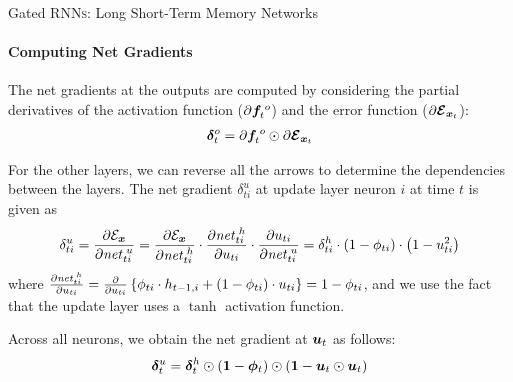 %
\begin{frame}{Gated RNN\textsc{s}: Long Short-Term Memory Networks}
\framesubtitle{Computing Net Gradients}
The
net gradients at the outputs are computed by considering the
partial derivatives of the activation function ($\partial{\boldsymbol f}^{\;o}_t$)
and the error function ($\partial{\bm{\mathcal E}}_{{\boldsymbol x}_t}$):
\begin{align*}
    {\bm \delta}^o_t = \partial{\boldsymbol f}^{\;o}_t \odot \partial{\bm{\mathcal E}}_{{\boldsymbol x}_t}
\end{align*}

For the other layers, we can reverse all the arrows to determine the
dependencies between the layers.
The net gradient $\delta_{ti}^u$ at update layer neuron $i$ at time $t$ is given as
\begin{align*}
    \delta_{ti}^u = 
    \frac{\partial {\mathcal E}_{\boldsymbol x}}{\partial \mathit{net}^{\;u}_{ti}}  = 
    \frac{\partial {\mathcal E}_{\boldsymbol x}}{\partial \mathit{net}^{\;h}_{ti}} \cdot 
    \frac{\partial \mathit{net}^{\;h}_{ti}}{\partial u_{ti}} \cdot
    \frac{\partial u_{ti}}{\partial \mathit{net}^{\;u}_{ti}}
     = \delta^h_{ti} \cdot (1 - \phi_{ti}) \cdot \left(1-u_{ti}^2\right)
\end{align*}
where 
$\frac{\partial \mathit{net}^{\;h}_{ti}}{\partial u_{ti}} = 
     \frac{\partial}{\partial
    u_{ti}} \left\{ \phi_{ti} \cdot h_{t-1,i} +  (1-\phi_{ti}) \cdot
    u_{ti}\right\} = 1 - \phi_{ti}$, and 
we use the fact that the update layer uses a $\tanh$ activation
function.

Across all neurons, we obtain the net gradient at
${\boldsymbol u}_t$ as follows:
\begin{align*}
    {\bm \delta}^{u}_{t} = {\bm \delta}^h_t \odot (\mathbf{1} -{\bm \phi}_t) 
    \odot (\mathbf{1} - {\boldsymbol u}_t  \odot {\boldsymbol u}_t )
\end{align*}
\end{frame}

